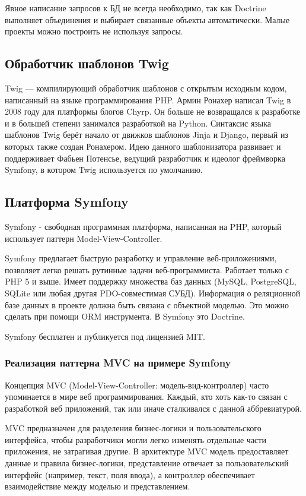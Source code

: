 Явное написание запросов к БД не всегда необходимо, так как Doctrine выполняет объединения и выбирает связанные объекты автоматически. Малые проекты можно построить не используя запросы.

\subsection{Обработчик шаблонов Twig}

Twig — компилирующий обработчик шаблонов с открытым исходным кодом, написанный на языке программирования PHP. Армин Ронахер написал Twig в 2008 году для платформы блогов Chyrp. Он больше не возвращался к разработке и в большей степени занимался разработкой на Python. Синтаксис языка шаблонов Twig берёт начало от движков шаблонов Jinja и Django, первый из которых также создан Ронахером. Идею данного шаблонизатора развивает и поддерживает Фабьен Потенсье, ведущий разработчик и идеолог фреймворка Symfony, в котором Twig используется по умолчанию.

\subsection{Платформа Symfony}
\label{sub:practice:symfony}

Symfony - свободная программная платформа, написанная на PHP, который использует паттерн Model-View-Controller.

Symfony предлагает быструю разработку и управление веб-приложениями, позволяет легко решать рутинные задачи веб-программиста. Работает только с PHP 5 и выше. Имеет поддержку множества баз данных (MySQL, PostgreSQL, SQLite или любая другая PDO-совместимая СУБД). Информация о реляционной базе данных в проекте должна быть связана с объектной моделью. Это можно сделать при помощи ORM инструмента. В Symfony это Doctrine.

Symfony бесплатен и публикуется под лицензией MIT.

\subsubsection{Реализация паттерна MVC на примере Symfony }

Концепция MVC (Model-View-Controller: модель-вид-контроллер) часто упоминается в мире веб программирования. Каждый, кто хоть как-то связан с разработкой веб приложений, так или иначе сталкивался с данной аббревиатурой. 

MVC предназначен для разделения бизнес-логики и пользовательского интерфейса, чтобы разработчики могли легко изменять отдельные части приложения, не затрагивая другие. В архитектуре MVC модель предоставляет данные и правила бизнес-логики, представление отвечает за пользовательский интерфейс (например, текст, поля ввода), а контроллер обеспечивает взаимодействие между моделью и представлением.

